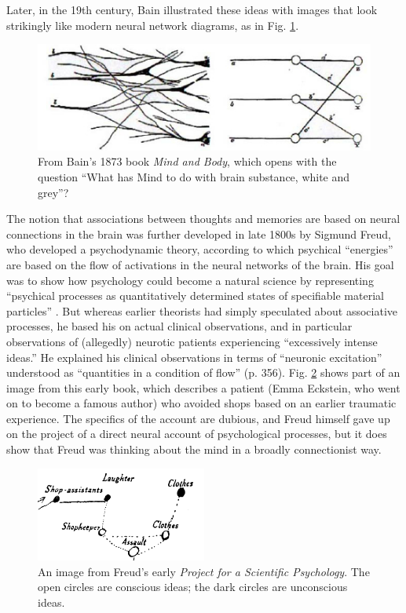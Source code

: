 Later, in the 19th century, Bain illustrated these ideas with images that look strikingly like modern neural network diagrams, as in Fig. \ref{bain}.

\begin{figure}[h]
\centering
\includegraphics[scale=.7]{./images/bain.jpg}
\caption[From  \cite{bain1873mind}, pp. 110-111.]{From Bain's 1873 book \emph{Mind and Body}, which opens with the question ``What has Mind to do with brain substance, white and grey''?}
\label{bain}
\end{figure}

The notion that associations between thoughts and memories are based on neural connections in the brain was further developed in late 1800s by Sigmund Freud, who developed a psychodynamic theory, according to which  psychical ``energies'' are based on the flow of activations in the neural networks of the brain. His goal was to show how psychology could become a natural science by representing ``psychical processes as quantitatively determined states of specifiable material particles'' \cite[p. 355]{freud1954project}. But whereas earlier theorists had simply speculated about associative processes, he based his on actual  clinical observations, and in particular observations of (allegedly) neurotic patients experiencing ``excessively intense ideas.''  He explained his clinical observations in terms of ``neuronic excitation'' understood as ``quantities in a condition of flow'' (p. 356). Fig. \ref{freud} shows part of an image from this early book, which describes a patient (Emma Eckstein, who went on to become a famous author) who avoided shops based on an earlier traumatic experience. The specifics of the account are dubious, and Freud himself gave up on the project of a direct neural account of psychological processes,  but it does show that Freud was thinking about the mind in a broadly connectionist way.

\begin{figure}[h]
\centering
\includegraphics[width=0.5\textwidth]{images/freud_scientific_psychology.png}
\caption[From \cite{freud1954project}.]{An image from Freud's early \emph{Project for a Scientific Psychology}. The open circles are conscious ideas; the dark circles are unconscious ideas. }
\label{freud}
\end{figure}

